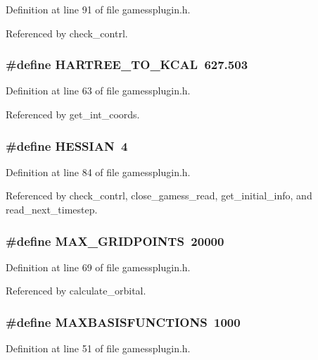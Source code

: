 Definition at line 91 of file gamessplugin.h.

Referenced by check\_\-contrl.
\subsubsection{\setlength{\rightskip}{0pt plus 5cm}\#define HARTREE\_\-TO\_\-KCAL\ 627.503}\label{gamessplugin_8h_a4}




Definition at line 63 of file gamessplugin.h.

Referenced by get\_\-int\_\-coords.
\subsubsection{\setlength{\rightskip}{0pt plus 5cm}\#define HESSIAN\ 4}\label{gamessplugin_8h_a11}




Definition at line 84 of file gamessplugin.h.

Referenced by check\_\-contrl, close\_\-gamess\_\-read, get\_\-initial\_\-info, and read\_\-next\_\-timestep.
\subsubsection{\setlength{\rightskip}{0pt plus 5cm}\#define MAX\_\-GRIDPOINTS\ 20000}\label{gamessplugin_8h_a5}




Definition at line 69 of file gamessplugin.h.

Referenced by calculate\_\-orbital.
\subsubsection{\setlength{\rightskip}{0pt plus 5cm}\#define MAXBASISFUNCTIONS\ 1000}\label{gamessplugin_8h_a1}




Definition at line 51 of file gamessplugin.h.

